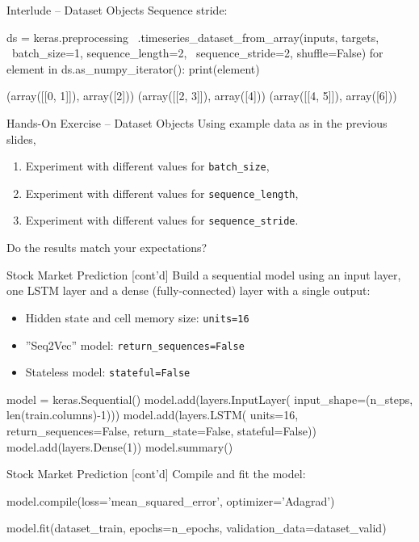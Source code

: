 \documentclass[ignorenonframetext,xcolor=x11names]{beamer}
\begin{document}
\begin{frame}[fragile]{Interlude -- Dataset Objects}
Sequence stride:

\begin{pythoncode}
ds = keras.preprocessing \
    .timeseries_dataset_from_array(inputs, targets, \
     batch_size=1, sequence_length=2, \
     sequence_stride=2, shuffle=False)
for element in ds.as_numpy_iterator():
     print(element)

(array([[0, 1]]), array([2]))
(array([[2, 3]]), array([4]))
(array([[4, 5]]), array([6]))
\end{pythoncode}
\end{frame}

\begin{frame}{Hands-On Exercise -- Dataset Objects}
Using example data as in the previous slides,
\begin{enumerate}
   \item Experiment with different values for \texttt{batch\_size},
   \item Experiment with different values for \texttt{sequence\_length},
   \item Experiment with different values for \texttt{sequence\_stride}.
\end{enumerate}
Do the results match your expectations?
\end{frame}

\begin{frame}[fragile]{Stock Market Prediction \small [cont'd]}
Build a sequential model using an input layer, one LSTM layer and a dense (fully-connected) layer with a single output:
\begin{itemize}
   \item Hidden state and cell memory size: \texttt{units=16}
   \item ''Seq2Vec'' model: \texttt{return\_sequences=False}
   \item Stateless model: \texttt{stateful=False}
\end{itemize}

\begin{pythoncode}
model = keras.Sequential()
model.add(layers.InputLayer(
    input_shape=(n_steps, len(train.columns)-1)))
model.add(layers.LSTM(
    units=16,
    return_sequences=False,
    return_state=False,
    stateful=False))
model.add(layers.Dense(1))
model.summary()
\end{pythoncode}
\end{frame} 

\begin{frame}[fragile]{Stock Market Prediction \small [cont'd]}
Compile and fit the model:
\begin{pythoncode}
model.compile(loss='mean_squared_error',
              optimizer='Adagrad')

model.fit(dataset_train,
          epochs=n_epochs,
          validation_data=dataset_valid)
\end{pythoncode}
\end{frame}
\end{document}
